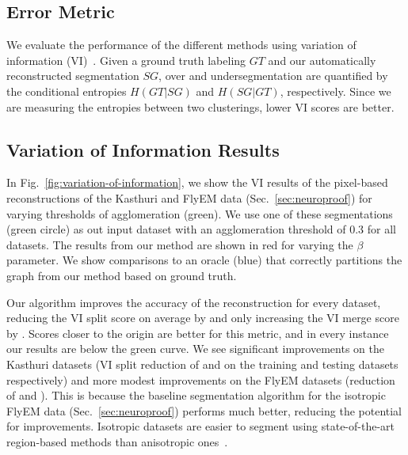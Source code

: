 
\subsection{Error Metric}
\label{sec:variation-of-information}

We evaluate the performance of the different methods using variation of information (VI)~\cite{meila2003comparing}.
Given a ground truth labeling $GT$ and our automatically reconstructed segmentation $SG$, over and undersegmentation are quantified by the conditional entropies $H(GT | SG)$ and $H(SG | GT)$, respectively. Since we are measuring the entropies between two clusterings, lower VI scores are better.

\subsection{Variation of Information Results}

In Fig.~\ref{fig:variation-of-information}, we show the VI results of the pixel-based reconstructions of the Kasthuri and FlyEM data (Sec.~\ref{sec:neuroproof}) for varying thresholds of agglomeration (green). We use one of these segmentations (green circle) as out input dataset with an agglomeration threshold of 0.3 for all datasets. The results from our method are shown in red for varying the $\beta$ parameter. We show comparisons to an oracle (blue) that correctly partitions the graph from our method based on ground truth.

Our algorithm improves the accuracy of the reconstruction for every dataset, reducing the VI split score on average by  and only increasing the VI merge score by .
Scores closer to the origin are better for this metric, and in every instance our results are below the green curve.
We see significant improvements on the Kasthuri datasets (VI split reduction of  and  on the training and testing datasets respectively) and more modest improvements on the FlyEM datasets (reduction of  and ). This is because the baseline segmentation algorithm for the isotropic FlyEM data (Sec.~\ref{sec:neuroproof}) performs much better, reducing the potential for improvements. Isotropic datasets are easier to segment using state-of-the-art region-based methods than anisotropic ones~\cite{plaza2014annotating}.

